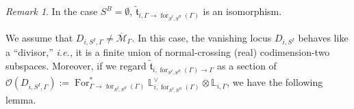 \documentclass[11pt]{amsart}
\theoremstyle{definition}
\theoremstyle{remark}
\newtheorem{rmk}[dummy]{Remark}
\renewcommand{\for}{\operatorname{for}}
\newcommand{\For}{\operatorname{For}}
\newcommand{\<}{\left<}
\renewcommand{\>}{\right>}
\numberwithin{equation}{section}
\def\Mbar{{\overline{\mathcal M}}}
\begin{document}
\begin{rmk}\label{rmk forget boundry point}
In the case $S^B=\emptyset$,  $\tilde{\mathfrak t}_{i,\Gamma \to \for_{{S^I,S^B}}(\Gamma)}$ is an isomorphism.
\end{rmk}
 We assume that %
$D_{i,S^I,\Gamma}\ne \Mbar_{\Gamma}$. In this %
case, the vanishing locus %
$D_{i,S^I}$ behaves like %
a ``divisor,'' \textit{i.e.,} %
it is a finite union of normal-crossing (real) codimension-two subspaces. Moreover, if we regard $\tilde{\mathfrak t}_{i,\for_{{S^I,S^B}}(\Gamma)\to \Gamma}$ as a section of $\mathcal O(D_{i,S^I,\Gamma}):=\For_{\Gamma \to \for_{{S^I,S^B}}(\Gamma)}^* \mathbb L_{i,\for_{{S^I,S^B}}(\Gamma)}^\vee \otimes \mathbb L_{i,\Gamma}$, we have the following lemma.
 
\end{document}
